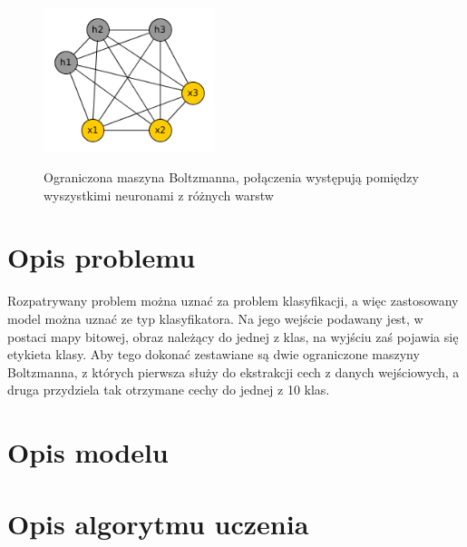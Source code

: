 \documentclass[a4paper,10pt]{article} %
\begin{document}
\begin{figure}
 \centering
 \includegraphics[width=5cm]{imgs/rbm.png}
 \label{fig:bm}
\caption{Ograniczona maszyna Boltzmanna, połączenia występują pomiędzy wyszystkimi neuronami z różnych
warstw}
\end{figure} 

\section{Opis problemu}

Rozpatrywany problem można uznać za problem klasyfikacji, a więc zastosowany model można uznać ze typ klasyfikatora. Na jego wejście podawany jest, w postaci mapy bitowej, obraz należący do jednej z klas, na wyjściu zaś pojawia się etykieta klasy. Aby tego dokonać zestawiane są dwie ograniczone maszyny Boltzmanna, z których pierwsza służy do ekstrakcji cech z danych wejściowych, a druga przydziela tak otrzymane cechy do jednej z 10 klas.

\section{Opis modelu}

\section{Opis algorytmu uczenia}
\end{document}
